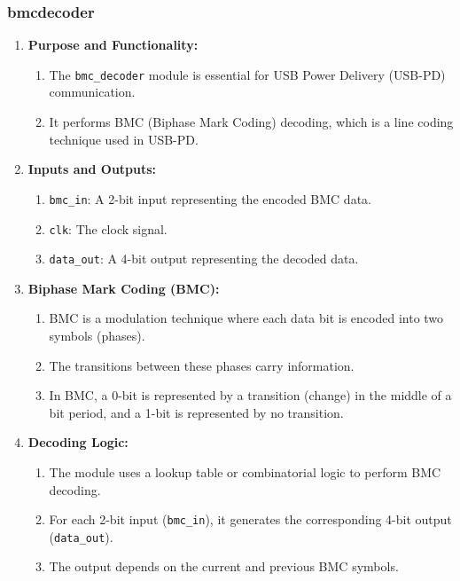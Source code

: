 \subsubsection{bmc\textunderscore decoder}
\begin{enumerate}
    \item \textbf{Purpose and Functionality:}
    \begin{enumerate}
        \item The \texttt{bmc\_decoder} module is essential for USB Power Delivery (USB-PD) communication.
        \item It performs BMC (Biphase Mark Coding) decoding, which is a line coding technique used in USB-PD.
    \end{enumerate}

    \item \textbf{Inputs and Outputs:}
    \begin{enumerate}
        \item \texttt{bmc\_in}: A 2-bit input representing the encoded BMC data.
        \item \texttt{clk}: The clock signal.
        \item \texttt{data\_out}: A 4-bit output representing the decoded data.
    \end{enumerate}

    \item \textbf{Biphase Mark Coding (BMC):}
    \begin{enumerate}
        \item BMC is a modulation technique where each data bit is encoded into two symbols (phases).
        \item The transitions between these phases carry information.
        \item In BMC, a 0-bit is represented by a transition (change) in the middle of a bit period, and a 1-bit is represented by no transition.
    \end{enumerate}

    \item \textbf{Decoding Logic:}
    \begin{enumerate}
        \item The module uses a lookup table or combinatorial logic to perform BMC decoding.
        \item For each 2-bit input (\texttt{bmc\_in}), it generates the corresponding 4-bit output (\texttt{data\_out}).
        \item The output depends on the current and previous BMC symbols.
    \end{enumerate}


\end{enumerate}
